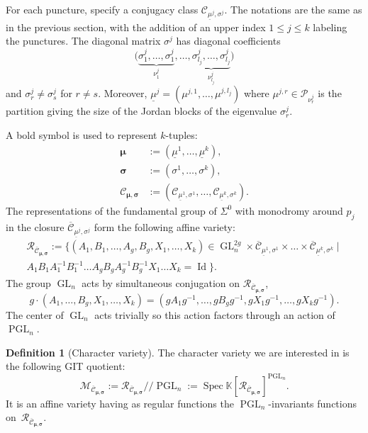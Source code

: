 \documentclass[JEP,XML,SOM,NoEqCountersInSection,Unicode,published]{cedram}
\newcommand{\gitquot}{/\!\!/}
\theoremstyle{definition}
\newtheorem{definition}{Definition}[section]
\theoremstyle{plain}
\DeclareMathOperator{\Spec}{Spec}
\DeclareMathOperator{\Id}{Id}
\DeclareMathOperator{\GL}{GL}
\DeclareMathOperator{\PGL}{PGL}
\newcommand\KK{\mathbb K }
\newcommand{\Part}{\mathcal{P}}
\newcommand{\inv}{^{-1}}
\begin{document}
For each puncture, specify a conjugacy class $\mathcal{C}_{\underline{\mu}^j,\sigma^j}$. The notations are the same as in the previous section, with the addition of an upper index $1\le j\le k$ labeling the punctures. The diagonal matrix $\sigma^j$ has diagonal coefficients
\[
\bigl(\underbrace{\sigma^j_1,\dots,\sigma^j_{1}}_{\nu^j_1},\dots, \underbrace{\sigma^j_{l_j},\dots,\sigma^j_{l_j}}_{\nu^j_{l_j}}\bigr)
\]
and $\sigma^j_r \ne \sigma^j_s$ for $r\ne s$.
Moreover, $\underline{\mu}^j=\left(\mu^{j,1},\dots,\mu^{j,l_j}\right)$ where $\mu^{j,r}\in \Part_{\nu^j_r}$ is the partition giving the size of the Jordan blocks of the eigenvalue $\sigma^j_r$.

A bold symbol is used to represent $k$-tuples:
\begin{equation}\label{eq_bold_kuple}
\begin{split}
\boldsymbol{\mu}& := (\underline{\mu}^1,\dots, \underline{\mu}^k), \\
\boldsymbol{\sigma} & :=(\sigma^1,\dots,\sigma^k),\\
\mathcal{C}_{\boldsymbol{\mu},\boldsymbol{\sigma}} & := (\mathcal{C}_{\underline{\mu}^1,\sigma^1}, \dots, \mathcal{C}_{\underline{\mu}^k,\sigma^k}).
\end{split}
\end{equation}
The representations of the fundamental group of $\Sigma^0$ with monodromy around $p_j$ in the closure $\overline{\mathcal{C}}_{\underline{\mu}^j,\sigma^j}$ form the following affine variety:
\begin{multline*}
\mathcal{R}_{\overline{\mathcal{C}}_{\boldsymbol{\mu},\boldsymbol{\sigma}}}:=\bigl\lbrace\left(A_1,B_1,\dots,A_g,B_g,X_1,\dots,X_k\right)\in \GL_n^{2g}\times \overline{\mathcal{C}}_{\underline{\mu}^1,\sigma^1}\times\dots\times \overline{\mathcal{C}}_{\underline{\mu}^k,\sigma^k}\mid \\ A_1 B_1 A_1\inv B_1\inv \dots A_g B_g A_g\inv B_g\inv X_1\dots X_k =\Id\bigr\rbrace.
\end{multline*}
The group $\GL_n$ acts by simultaneous conjugation on $\mathcal{R}_{\overline{\mathcal{C}}_{\boldsymbol{\mu},\boldsymbol{\sigma}}}$,
\begin{equation*}
g\cdot(A_1,\dots,B_g,X_1,\dots,X_k)=(g A_1 g\inv,\dots,g B_g g\inv,g X_1 g\inv,\dots,g X_k g\inv).
\end{equation*}
The center of $\GL_n$ acts trivially so this action factors through an action of $\PGL_n$.
\begin{definition}[Character variety]
The character variety we are interested in is the following GIT quotient:
\begin{equation*}
\mathcal{M}_{\overline{\mathcal{C}}_{\boldsymbol{\mu},\boldsymbol{\sigma}}} :=\mathcal{R}_{\overline{\mathcal{C}}_{\boldsymbol{\mu},\boldsymbol{\sigma}}} \gitquot\PGL_n :=\Spec \KK[ \mathcal{R}_{\overline{\mathcal{C}}_{\boldsymbol{\mu},\boldsymbol{\sigma}}}]^{\PGL_n}.
\end{equation*}
It is an affine variety having as regular functions the $\PGL_n$-invariants functions on~$\mathcal{R}_{\overline{\mathcal{C}}_{\boldsymbol{\mu},\boldsymbol{\sigma}}}$.
\end{definition}
\end{document}
